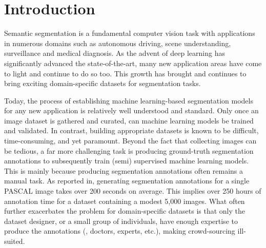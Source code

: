 \section{Introduction}
\label{sec:full_weakintro}
Semantic segmentation is a fundamental computer vision task with applications in numerous domains such as autonomous driving, scene understanding, surveillance and medical diagnosis. As the advent of deep learning has significantly advanced the state-of-the-art, many new application areas have come to light and continue to do so too. This growth has brought and continues to bring exciting domain-specific datasets for segmentation tasks. 

Today, the process of establishing machine learning-based segmentation models for any new application is relatively well understood and standard. Only once an image dataset is gathered and curated, can machine learning models be trained and validated. In contrast, building appropriate datasets is known to be difficult, time-consuming, and yet paramount. Beyond the fact that collecting images can be tedious, a far more challenging task is producing ground-truth segmentation annotations to subsequently train (semi) supervised machine learning models. This is mainly because producing segmentation annotations often remains a manual task. As reported in, generating segmentation annotations for a single PASCAL image takes over 200 seconds on average. This implies over 250 hours of annotation time for a dataset containing a modest 5,000 images. What often further exacerbates the problem for domain-specific datasets is that only the dataset designer, or a small group of individuals, have enough expertise to produce the annotations (\eg, doctors, experts, etc.), making crowd-sourcing ill-suited. 

